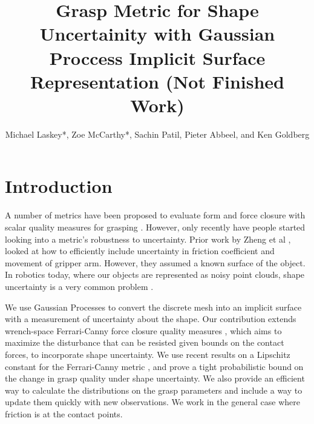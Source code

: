 \documentclass[letterpaper, 10 pt, conference]{ieeeconf}  %
\title{\LARGE \bf
Grasp Metric for Shape Uncertainity with Gaussian Proccess Implicit Surface Representation (Not Finished Work) }
\author{Michael Laskey*, Zoe McCarthy*, Sachin Patil, Pieter Abbeel, and Ken Goldberg}%
\begin{document}
\maketitle
\thispagestyle{empty}
\pagestyle{empty}





\section{Introduction}

\vspace{10pt}
 A number of metrics have been proposed to evaluate form and force closure with scalar quality measures for grasping \cite{bicchi2000}. However, only recently have people started looking into a metric's robustness to uncertainty. Prior work by Zheng et al \cite{zheng2005}, looked at how to efficiently include uncertainty in friction coefficient and movement of gripper arm. However, they assumed a known surface of the object. In robotics today, where our objects are represented as noisy point clouds, shape uncertainty is a very common problem \cite{singhbigbird}. 
 
 We use Gaussian Processes \cite{rasmussen2006} to convert the discrete mesh into an implicit surface with a measurement of uncertainty about the shape. Our contribution extends wrench-space Ferrari-Canny force closure quality measures \cite{ferrari1992}, which aims to maximize the disturbance that can be resisted given bounds on the contact forces, to incorporate shape uncertainty. We use recent results on a Lipschitz  constant for the Ferrari-Canny metric \cite{pokorny2013classical}, and prove a tight probabilistic bound on the change in grasp quality under shape uncertainty. We also provide an efficient way to calculate the distributions on the grasp parameters and include a way to update them quickly with new observations. We work in the general case where friction is at the contact points. 
\end{document}
